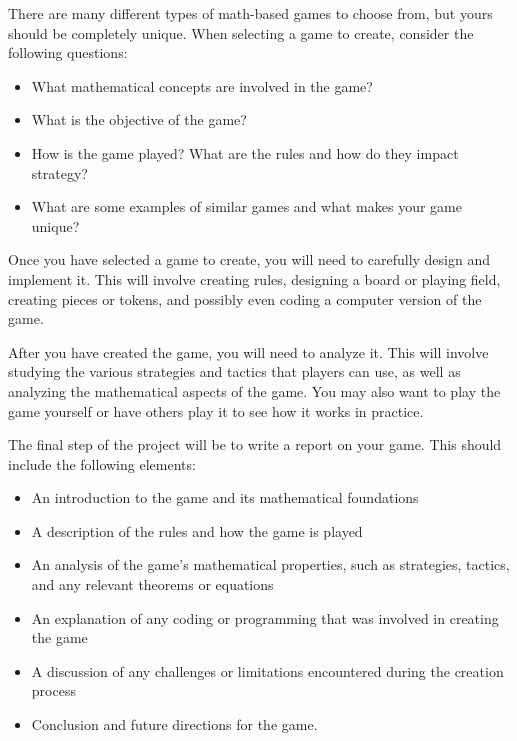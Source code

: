 \documentclass{article}
\newcounter{counter}
\begin{document}
    \vspace{3mm}
    There are many different types of math-based games to choose from, but yours should be completely unique. When selecting a game to create, consider the following questions:
    
    \begin{itemize}
    \item What mathematical concepts are involved in the game?
    \item What is the objective of the game?
    \item How is the game played? What are the rules and how do they impact strategy?
    \item What are some examples of similar games and what makes your game unique?
    \end{itemize}
    
    \vspace{3mm}
    Once you have selected a game to create, you will need to carefully design and implement it. This will involve creating rules, designing a board or playing field, creating pieces or tokens, and possibly even coding a computer version of the game.
    
    \vspace{3mm}
    After you have created the game, you will need to analyze it. This will involve studying the various strategies and tactics that players can use, as well as analyzing the mathematical aspects of the game. You may also want to play the game yourself or have others play it to see how it works in practice.
    
    \vspace{3mm}
    The final step of the project will be to write a report on your game. This should include the following elements:
    
    \begin{itemize}
    \item An introduction to the game and its mathematical foundations
    \item A description of the rules and how the game is played
    \item An analysis of the game's mathematical properties, such as strategies, tactics, and any relevant theorems or equations
    \item An explanation of any coding or programming that was involved in creating the game
    \item A discussion of any challenges or limitations encountered during the creation process
    \item Conclusion and future directions for the game.
    \end{itemize}
    
\end{document}
